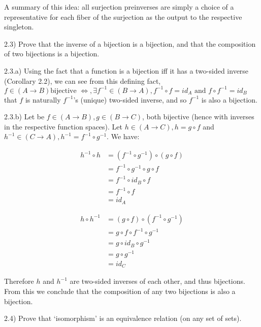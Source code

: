 A summary of this idea: all surjection preinverses are simply a choice of a representative for each fiber of the surjection as the output to the respective singleton.



2.3) Prove that the inverse of a bijection is a bijection, and that the composition
of two bijections is a bijection.

2.3.a) Using the fact that a function is a bijection iff it has a two-sided inverse (Corollary 2.2), we can see from this defining fact, $f \in (A \to B) \text{bijective } \Leftrightarrow, \exists f^{-1} \in (B \to A), f^{-1} \circ f = id_A \text { and } f \circ f^{-1} = id_B$ that $f$ is naturally $f^{-1}$'s (unique) two-sided inverse, and so $f^{-1}$ is also a bijection.

2.3.b) Let be $f \in (A \to B), g \in (B \to C)$, both bijective (hence with inverses in the respective function spaces). Let $h \in (A \to C), h = g \circ f$ and $h^{-1} \in (C \to A), h^{-1} = f^{-1} \circ g^{-1}$. We have:

$$
\begin{align*}
h^{-1} \circ h &= (f^{-1} \circ g^{-1}) \circ (g \circ f) \\
               &=  f^{-1} \circ g^{-1}  \circ  g \circ f  \\
               &=  f^{-1} \circ          id_B    \circ f  \\
               &=  f^{-1} \circ                        f  \\
               &=  id_A
\end{align*}
$$

$$
\begin{align*}
h \circ h^{-1} &= (g \circ f) \circ (f^{-1} \circ g^{-1}) \\
               &=  g \circ f  \circ  f^{-1} \circ g^{-1}  \\
               &=  g \circ     id_B         \circ g^{-1}  \\
               &=  g \circ                        g^{-1}  \\
               &=  id_C
\end{align*}
$$

Therefore $h$ and $h^{-1}$ are two-sided inverses of each other, and thus bijections. From this we conclude that the composition of any two bijections is also a bijection.



2.4) Prove that ‘isomorphism’ is an equivalence relation (on any set of sets).

